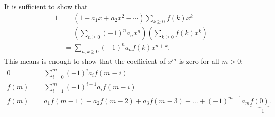\documentclass{article}
\newenvironment{solution}[1][Solution.]{\begin{trivlist}
\item[\hskip \labelsep {\bfseries #1}]}{\end{trivlist}}
\begin{document}
\begin{solution} \text{}
  It is sufficient to show that \begin{align*}
    1
    &= (1 - a_1x + a_2x^2 - \cdots)\sum_{k \geq 0} f(k)x^k \\
    &= \left(\sum_{n \geq 0} (-1)^n a_n x^n\right)\left(\sum_{k \geq 0} f(k)x^k\right) \\
    &= \sum_{n,k \geq 0} (-1)^n a_n f(k)x^{n+k}.
  \end{align*}
  This means is enough to show that the coefficient of $x^m$ is zero for all $m > 0$: \begin{align*}
    0  &= \sum_{i=0}^m (-1)^i a_i f(m-i) \\
    f(m) & = \sum_{i=1}^m (-1)^{i-1} a_i f(m-i) \\
    f(m) & = a_1f(m-1) - a_2f(m-2) + a_3f(m-3) + \hdots + (-1)^{m-1} a_m\underbrace{f(0)}_{=1}.

\end{align*}
\end{solution}
\end{document}
